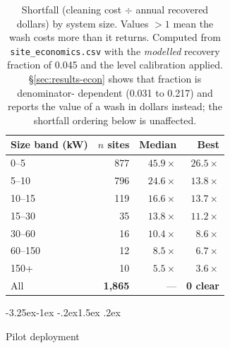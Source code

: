 \documentclass[10pt,twocolumn]{article}
\makeatletter
\newcommand{\artifact}[1]{{\small\texttt{#1}}}
\renewcommand\subsection{\@startsection{subsection}{2}{\z@}%
  {-3.25ex\@plus -1ex \@minus -.2ex}{1.5ex \@plus .2ex}%
  {\normalfont\large\bfseries\raggedright}}
\makeatother
\begin{document}
\begin{table}[t]
\centering\small
\caption{Shortfall (cleaning cost $\div$ annual recovered dollars) by system size. Values
$>1$ mean the wash costs more than it returns. Computed from
\artifact{site\_economics.csv} with the \emph{modelled} recovery fraction of 0.045 and the
level calibration applied. \S\ref{sec:results-econ} shows that fraction is denominator-
dependent (0.031 to 0.217) and reports the value of a wash in dollars instead; the
shortfall ordering below is unaffected.}
\label{tab:shortfall}
\begin{tabular}{lrrr}
\toprule
Size band (kW) & $n$ sites & Median & Best \\
\midrule
0--5      & 877 & $45.9\times$ & $26.5\times$ \\
5--10     & 796 & $24.6\times$ & $13.8\times$ \\
10--15    & 119 & $16.6\times$ & $13.7\times$ \\
15--30    & 35  & $13.8\times$ & $11.2\times$ \\
30--60    & 16  & $10.4\times$ & $8.6\times$ \\
60--150   & 12  & $8.5\times$  & $6.7\times$ \\
150+      & 10  & $5.5\times$  & $\mathbf{3.6\times}$ \\
\midrule
All       & \textbf{1{,}865} & --- & \textbf{0 clear} \\
\bottomrule
\end{tabular}
\end{table}

\subsection{Pilot deployment}
\label{sec:pilot}
\end{document}
